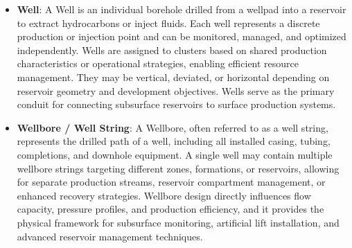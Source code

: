 \documentclass[12pt,APA]{uomthesis}
\begin{document}
\begin{itemize}
    \item \textbf{Well}: A Well is an individual borehole drilled from a wellpad into a reservoir to extract hydrocarbons or inject fluids. Each well represents a discrete production or injection point and can be monitored, managed, and optimized independently. Wells are assigned to clusters based on shared production characteristics or operational strategies, enabling efficient resource management. They may be vertical, deviated, or horizontal depending on reservoir geometry and development objectives. Wells serve as the primary conduit for connecting subsurface reservoirs to surface production systems.
    \item \textbf{Wellbore / Well String}: A Wellbore, often referred to as a well string, represents the drilled path of a well, including all installed casing, tubing, completions, and downhole equipment. A single well may contain multiple wellbore strings targeting different zones, formations, or reservoirs, allowing for separate production streams, reservoir compartment management, or enhanced recovery strategies. Wellbore design directly influences flow capacity, pressure profiles, and production efficiency, and it provides the physical framework for subsurface monitoring, artificial lift installation, and advanced reservoir management techniques.
\end{itemize}
\end{document}
